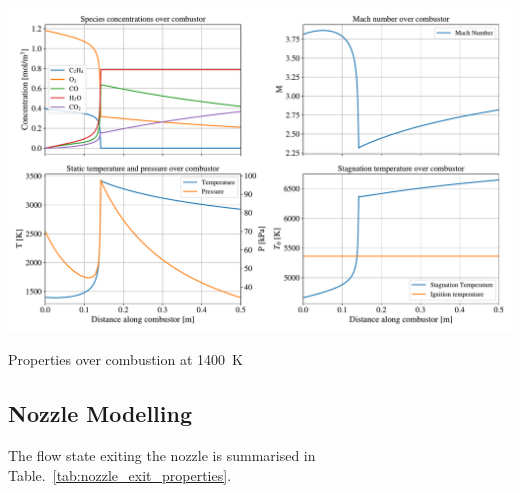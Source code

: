 \documentclass[a4paper]{article}
\begin{document}
\begin{widefigure}[10mm]
    \centering
    \includegraphics[width=\linewidth]{part_2_img/subfig_1400.pdf}
    \caption{Properties over combustion at 1400~K}
    \label{fig:properties_1400}
\end{widefigure}

\subsection{Nozzle Modelling}
The flow state exiting the nozzle is summarised in Table.~\ref{tab:nozzle_exit_properties}.
\end{document}
